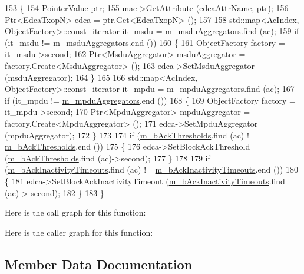\begin{DoxyCode}
153 \{
154   PointerValue ptr;
155   mac->GetAttribute (edcaAttrName, ptr);
156   Ptr<EdcaTxopN> edca = ptr.Get<EdcaTxopN> ();
157 
158   std::map<AcIndex, ObjectFactory>::const\_iterator it\_msdu = \hyperlink{classns3_1_1QosWifiMacHelper_a96ac4b7291dd02ef475a44d56ab64ab4}{m\_msduAggregators}.find (ac);
159   \textcolor{keywordflow}{if} (it\_msdu != \hyperlink{classns3_1_1QosWifiMacHelper_a96ac4b7291dd02ef475a44d56ab64ab4}{m\_msduAggregators}.end ())
160     \{
161       ObjectFactory factory = it\_msdu->second;
162       Ptr<MsduAggregator> msduAggregator = factory.Create<MsduAggregator> ();
163       edca->SetMsduAggregator (msduAggregator);
164     \}
165 
166   std::map<AcIndex, ObjectFactory>::const\_iterator it\_mpdu = \hyperlink{classns3_1_1QosWifiMacHelper_a489cb3650492ad98b37ba54e87f97c15}{m\_mpduAggregators}.find (ac);
167   \textcolor{keywordflow}{if} (it\_mpdu != \hyperlink{classns3_1_1QosWifiMacHelper_a489cb3650492ad98b37ba54e87f97c15}{m\_mpduAggregators}.end ())
168     \{
169       ObjectFactory factory = it\_mpdu->second;
170       Ptr<MpduAggregator> mpduAggregator = factory.Create<MpduAggregator> ();
171       edca->SetMpduAggregator (mpduAggregator);
172     \}
173     
174   \textcolor{keywordflow}{if} (\hyperlink{classns3_1_1QosWifiMacHelper_a0725f0e95f9655273bb9c4e3b862dd27}{m\_bAckThresholds}.find (ac) != \hyperlink{classns3_1_1QosWifiMacHelper_a0725f0e95f9655273bb9c4e3b862dd27}{m\_bAckThresholds}.end ())
175     \{
176       edca->SetBlockAckThreshold (\hyperlink{classns3_1_1QosWifiMacHelper_a0725f0e95f9655273bb9c4e3b862dd27}{m\_bAckThresholds}.find (ac)->second);
177     \}
178     
179   \textcolor{keywordflow}{if} (\hyperlink{classns3_1_1QosWifiMacHelper_a532f48518af420308c6b2b81308e92e4}{m\_bAckInactivityTimeouts}.find (ac) != 
      \hyperlink{classns3_1_1QosWifiMacHelper_a532f48518af420308c6b2b81308e92e4}{m\_bAckInactivityTimeouts}.end ())
180     \{
181       edca->SetBlockAckInactivityTimeout (\hyperlink{classns3_1_1QosWifiMacHelper_a532f48518af420308c6b2b81308e92e4}{m\_bAckInactivityTimeouts}.find (ac)->
      second);
182     \}
183 \}
\end{DoxyCode}


Here is the call graph for this function\+:




Here is the caller graph for this function\+:




\subsection{Member Data Documentation}
